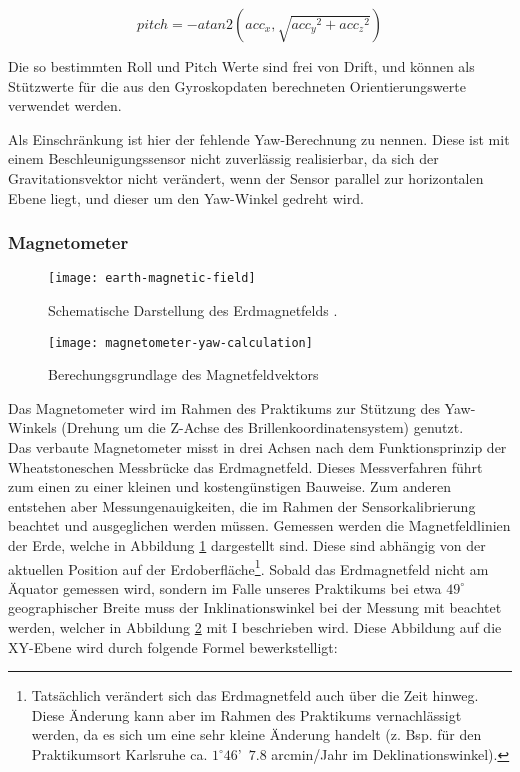 \begin{equation}
    pitch = -atan2(acc_x, \sqrt{ {acc_y}^2 + {acc_z}^2 })
\end{equation}

Die so bestimmten Roll und Pitch Werte sind frei von Drift, und können
als Stützwerte für die aus den Gyroskopdaten berechneten
Orientierungswerte verwendet werden. 

Als Einschränkung ist hier der fehlende Yaw-Berechnung zu nennen. Diese
ist mit einem Beschleunigungssensor nicht zuverlässig realisierbar, da
sich der Gravitationsvektor nicht verändert, wenn der Sensor
parallel zur horizontalen Ebene liegt, und dieser um den Yaw-Winkel gedreht 
wird.



\subsubsection{Magnetometer}
\label{headtracking_magnetometer_subsubsec}
\begin{figure}
   \centering
   \texttt{[image: earth-magnetic-field]}
   \caption[mag_world]{Schematische Darstellung des Erdmagnetfelds \cite{mag_world_source}.}
   \label{fig:mag_world}
\end{figure}

\begin{figure}
   \centering
   \texttt{[image: magnetometer-yaw-calculation]}
   \caption[mag_mapping]{Berechungsgrundlage des Magnetfeldvektors}
   \label{fig:mag_mapping}
\end{figure}
Das Magnetometer wird im Rahmen des Praktikums zur Stützung des Yaw-Winkels (Drehung um die Z-Achse des Brillenkoordinatensystem) genutzt.\\
Das verbaute Magnetometer misst in drei Achsen nach dem Funktionsprinzip der Wheatstoneschen Messbrücke \cite{renaudin2010complete} das Erdmagnetfeld.
Dieses Messverfahren führt zum einen zu einer kleinen und kostengünstigen Bauweise.
Zum anderen entstehen aber Messungenauigkeiten, die im Rahmen der Sensorkalibrierung beachtet und ausgeglichen werden müssen.
Gemessen werden die Magnetfeldlinien der Erde, welche in Abbildung \ref{fig:mag_world} dargestellt sind.
Diese sind abhängig von der aktuellen Position auf der Erdoberfläche\footnote{Tatsächlich verändert sich das Erdmagnetfeld auch über die Zeit hinweg.
Diese Änderung kann aber im Rahmen des Praktikums vernachlässigt werden, da es sich um eine sehr kleine Änderung handelt (z. Bsp. für den Praktikumsort Karlsruhe ca. $1^\circ 46$'~$7.8$ arcmin/Jahr im Deklinationswinkel).}.
Sobald das Erdmagnetfeld nicht am Äquator gemessen wird, sondern im Falle unseres Praktikums bei etwa $49^\circ$ geographischer Breite muss der Inklinationswinkel bei der Messung mit beachtet werden, welcher in Abbildung \ref{fig:mag_mapping} mit I beschrieben wird.
Diese Abbildung auf die XY-Ebene wird durch folgende Formel bewerkstelligt:

